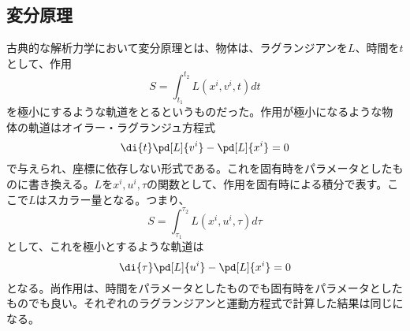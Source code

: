         \subsection{変分原理}
            古典的な解析力学において変分原理とは、物体は、ラグランジアンを$L$、時間を$t$として、作用
                \[S = \int_{t_1}^{t_2} L(x^i,v^i,t)dt\]
            を極小にするような軌道をとるというものだった。作用が極小になるような物体の軌道はオイラー・ラグランジュ方程式
                \[\di{t}\pd[L]{v^i}-\pd[L]{x^i} = 0\]
            で与えられ、座標に依存しない形式である。これを固有時をパラメータとしたものに書き換える。$Lをx^i,u^i,\tau$の関数として、作用を固有時による積分で表す。ここで$L$はスカラー量となる。つまり、
                \[S = \int_{\tau_1}^{\tau_2} L(x^i,u^i,\tau)d\tau\]
            として、これを極小とするような軌道は
                \[\di{\tau}\pd[L]{u^i}-\pd[L]{x^i} = 0\]
            となる。尚作用は、時間をパラメータとしたものでも固有時をパラメータとしたものでも良い。それぞれのラグランジアンと運動方程式で計算した結果は同じになる。
